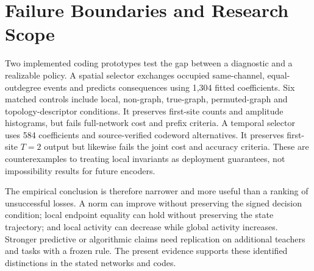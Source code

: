 \documentclass[10pt,twocolumn,letterpaper]{article}
\begin{document}
\section{Failure Boundaries and Research Scope}
Two implemented coding prototypes test the gap between a diagnostic and a realizable policy. A spatial selector exchanges occupied same-channel, equal-outdegree events and predicts consequences using 1,304 fitted coefficients. Six matched controls include local, non-graph, true-graph, permuted-graph and topology-descriptor conditions. It preserves first-site counts and amplitude histograms, but fails full-network cost and prefix criteria. A temporal selector uses 584 coefficients and source-verified codeword alternatives. It preserves first-site $T=2$ output but likewise fails the joint cost and accuracy criteria. These are counterexamples to treating local invariants as deployment guarantees, not impossibility results for future encoders.

The empirical conclusion is therefore narrower and more useful than a ranking of unsuccessful losses. A norm can improve without preserving the signed decision condition; local endpoint equality can hold without preserving the state trajectory; and local activity can decrease while global activity increases. Stronger predictive or algorithmic claims need replication on additional teachers and tasks with a frozen rule. The present evidence supports these identified distinctions in the stated networks and codes.
\end{document}
